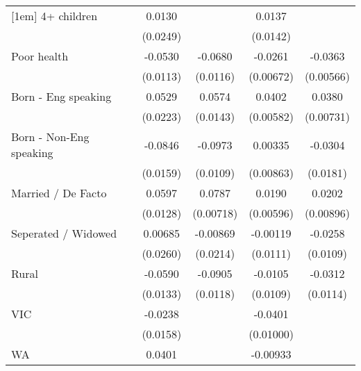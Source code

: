 {\begin{tabular}{l*{4}{c}}
[1em]
4+ children         &      0.0130         &                     &      0.0137         &                     \\
                    &    (0.0249)         &                     &    (0.0142)         &                     \\
[1em]
Poor health         &     -0.0530\sym{***}&     -0.0680\sym{***}&     -0.0261\sym{***}&     -0.0363\sym{***}\\
                    &    (0.0113)         &    (0.0116)         &   (0.00672)         &   (0.00566)         \\
[1em]
Born - Eng speaking &      0.0529\sym{*}  &      0.0574\sym{***}&      0.0402\sym{***}&      0.0380\sym{***}\\
                    &    (0.0223)         &    (0.0143)         &   (0.00582)         &   (0.00731)         \\
[1em]
Born - Non-Eng speaking&     -0.0846\sym{***}&     -0.0973\sym{***}&     0.00335         &     -0.0304         \\
                    &    (0.0159)         &    (0.0109)         &   (0.00863)         &    (0.0181)         \\
[1em]
Married / De Facto  &      0.0597\sym{***}&      0.0787\sym{***}&      0.0190\sym{**} &      0.0202\sym{*}  \\
                    &    (0.0128)         &   (0.00718)         &   (0.00596)         &   (0.00896)         \\
[1em]
Seperated / Widowed &     0.00685         &    -0.00869         &    -0.00119         &     -0.0258\sym{*}  \\
                    &    (0.0260)         &    (0.0214)         &    (0.0111)         &    (0.0109)         \\
[1em]
Rural               &     -0.0590\sym{***}&     -0.0905\sym{***}&     -0.0105         &     -0.0312\sym{**} \\
                    &    (0.0133)         &    (0.0118)         &    (0.0109)         &    (0.0114)         \\
[1em]
VIC                 &     -0.0238         &                     &     -0.0401\sym{***}&                     \\
                    &    (0.0158)         &                     &   (0.01000)         &                     \\
[1em]
WA                  &      0.0401\sym{*}  &                     &    -0.00933         &                     \\

\end{tabular}}
